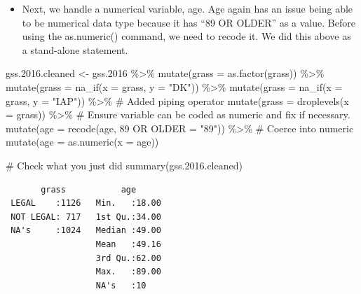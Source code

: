 \documentclass[
  letterpaper,
  DIV=11,
  numbers=noendperiod]{scrreprt}
\newenvironment{Shaded}{\begin{snugshade}}{\end{snugshade}}
\newcommand{\AttributeTok}[1]{\textcolor[rgb]{0.40,0.45,0.13}{#1}}
\newcommand{\CommentTok}[1]{\textcolor[rgb]{0.37,0.37,0.37}{#1}}
\newcommand{\FloatTok}[1]{\textcolor[rgb]{0.68,0.00,0.00}{#1}}
\newcommand{\FunctionTok}[1]{\textcolor[rgb]{0.28,0.35,0.67}{#1}}
\newcommand{\NormalTok}[1]{\textcolor[rgb]{0.00,0.23,0.31}{#1}}
\newcommand{\OtherTok}[1]{\textcolor[rgb]{0.00,0.23,0.31}{#1}}
\newcommand{\SpecialCharTok}[1]{\textcolor[rgb]{0.37,0.37,0.37}{#1}}
\newcommand{\StringTok}[1]{\textcolor[rgb]{0.13,0.47,0.30}{#1}}
\providecommand{\tightlist}{%
  \setlength{\itemsep}{0pt}\setlength{\parskip}{0pt}}\usepackage{longtable,booktabs,array}
\begin{document}
\begin{itemize}
\tightlist
\item
  Next, we handle a numerical variable, age. Age again has an issue
  being able to be numerical data type because it has ``89 OR OLDER'' as
  a value. Before using the as.numeric() command, we need to recode it.
  We did this above as a stand-alone statement.\\
\end{itemize}

\begin{Shaded}
\begin{Highlighting}[]
\NormalTok{gss.}\FloatTok{2016.}\NormalTok{cleaned }\OtherTok{\textless{}{-}}\NormalTok{ gss}\FloatTok{.2016} \SpecialCharTok{\%\textgreater{}\%}
    \FunctionTok{mutate}\NormalTok{(}\AttributeTok{grass =} \FunctionTok{as.factor}\NormalTok{(grass)) }\SpecialCharTok{\%\textgreater{}\%}
    \FunctionTok{mutate}\NormalTok{(}\AttributeTok{grass =} \FunctionTok{na\_if}\NormalTok{(}\AttributeTok{x =}\NormalTok{ grass, }\AttributeTok{y =} \StringTok{"DK"}\NormalTok{)) }\SpecialCharTok{\%\textgreater{}\%}
    \FunctionTok{mutate}\NormalTok{(}\AttributeTok{grass =} \FunctionTok{na\_if}\NormalTok{(}\AttributeTok{x =}\NormalTok{ grass, }\AttributeTok{y =} \StringTok{"IAP"}\NormalTok{)) }\SpecialCharTok{\%\textgreater{}\%}
    \CommentTok{\# Added piping operator}
\FunctionTok{mutate}\NormalTok{(}\AttributeTok{grass =} \FunctionTok{droplevels}\NormalTok{(}\AttributeTok{x =}\NormalTok{ grass)) }\SpecialCharTok{\%\textgreater{}\%}
    \CommentTok{\# Ensure variable can be coded as numeric and fix if necessary.}
\FunctionTok{mutate}\NormalTok{(}\AttributeTok{age =} \FunctionTok{recode}\NormalTok{(age, }\StringTok{\textasciigrave{}}\AttributeTok{89 OR OLDER}\StringTok{\textasciigrave{}} \OtherTok{=} \StringTok{"89"}\NormalTok{)) }\SpecialCharTok{\%\textgreater{}\%}
    \CommentTok{\# Coerce into numeric}
\FunctionTok{mutate}\NormalTok{(}\AttributeTok{age =} \FunctionTok{as.numeric}\NormalTok{(}\AttributeTok{x =}\NormalTok{ age))}

\CommentTok{\# Check what you just did}
\FunctionTok{summary}\NormalTok{(gss.}\FloatTok{2016.}\NormalTok{cleaned)}
\end{Highlighting}
\end{Shaded}

\begin{verbatim}
       grass           age       
 LEGAL    :1126   Min.   :18.00  
 NOT LEGAL: 717   1st Qu.:34.00  
 NA's     :1024   Median :49.00  
                  Mean   :49.16  
                  3rd Qu.:62.00  
                  Max.   :89.00  
                  NA's   :10     
\end{verbatim}
\end{document}
